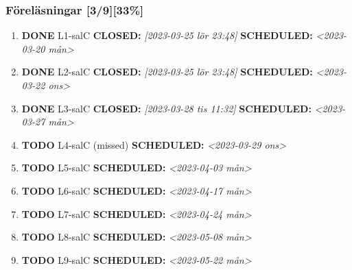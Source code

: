 \documentclass[11pt]{article}
\begin{document}
\subsubsection{Föreläsningar [3/9][33\%]}
\label{sec:org4b66b8f}
\begin{enumerate}
\item {\bfseries\sffamily DONE} L1-salC
\label{sec:org35e2c91}
\noindent\textbf{CLOSED:} \textit{[2023-03-25 lör 23:48] } \textbf{SCHEDULED:} \textit{<2023-03-20 mån>}\\[0pt]
\item {\bfseries\sffamily DONE} L2-salC
\label{sec:org96c5c15}
\noindent\textbf{CLOSED:} \textit{[2023-03-25 lör 23:48] } \textbf{SCHEDULED:} \textit{<2023-03-22 ons>}\\[0pt]
\item {\bfseries\sffamily DONE} L3-salC
\label{sec:org5375531}
\noindent\textbf{CLOSED:} \textit{[2023-03-28 tis 11:32] } \textbf{SCHEDULED:} \textit{<2023-03-27 mån>}\\[0pt]
\item {\bfseries\sffamily TODO} L4-salC (missed)
\label{sec:org3e9ce36}
\noindent\textbf{SCHEDULED:} \textit{<2023-03-29 ons>}\\[0pt]
\item {\bfseries\sffamily TODO} L5-salC
\label{sec:orgfc39d25}
\noindent\textbf{SCHEDULED:} \textit{<2023-04-03 mån>}\\[0pt]
\item {\bfseries\sffamily TODO} L6-salC
\label{sec:orgf7a02ef}
\noindent\textbf{SCHEDULED:} \textit{<2023-04-17 mån>}\\[0pt]
\item {\bfseries\sffamily TODO} L7-salC
\label{sec:org0f3ec88}
\noindent\textbf{SCHEDULED:} \textit{<2023-04-24 mån>}\\[0pt]
\item {\bfseries\sffamily TODO} L8-salC
\label{sec:org614ae4b}
\noindent\textbf{SCHEDULED:} \textit{<2023-05-08 mån>}\\[0pt]
\item {\bfseries\sffamily TODO} L9-salC
\label{sec:orgd77f12c}
\noindent\textbf{SCHEDULED:} \textit{<2023-05-22 mån>}\\[0pt]
\end{enumerate}
\end{document}
